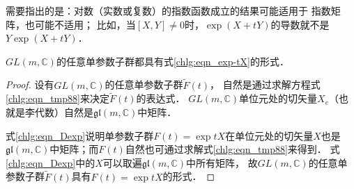 需要指出的是：对数（实数或复数）的指数函数成立的结果可能适用于
指数矩阵，也可能不适用；
比如，当$[X,Y]\neq 0$时，$\exp(X+tY)$的导数就不是$Y\exp(X+tY)$．


\begin{proposition}\label{chlg:thm_GL-expA}
    $GL(m,\mathbb{C})$的任意单参数子群都具有式\eqref{chlg:eqn_exp-tX}的形式．
\end{proposition}
\begin{proof}
设有$GL(m,\mathbb{C})$的任意单参数子群$\widetilde{F}(t)$，
自然是通过求解方程式\eqref{chlg:eqn_tmp88}来决定$\widetilde{F}(t)$的表达式．
$GL(m,\mathbb{C})$单位元处的切矢量$X_e$（也就是李代数）自然是$\mathfrak{gl}(m,\mathbb{C})$中矩阵．

式\eqref{chlg:eqn_Dexp}说明单参数子群$F(t)=\exp tX$在单位元处的切矢量$X$也是
$\mathfrak{gl}(m,\mathbb{C})$中矩阵；而$F(t)$自然也可通过求解式\eqref{chlg:eqn_tmp88}来得到．
式\eqref{chlg:eqn_Dexp}中的$X$可以取遍$\mathfrak{gl}(m,\mathbb{C})$中所有矩阵，
故$GL(m,\mathbb{C})$的任意单参数子群$\widetilde{F}(t)$具有$F(t)=\exp tX$的形式．
\end{proof}


